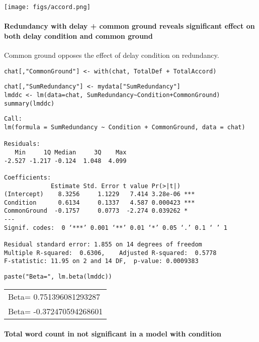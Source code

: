 \documentclass[10pt]{article}
\begin{document}
\texttt{[image: figs/accord.png]}


\paragraph*{Redundancy with delay + common ground reveals significant effect on both delay condition and common ground}
\label{sec-2-4-3-2}

Common ground opposes the effect of delay condition on redundancy.

\begin{verbatim}
chat[,"CommonGround"] <- with(chat, TotalDef + TotalAccord)
\end{verbatim}


\begin{verbatim}
chat[,"SumRedundancy"] <- mydata["SumRedundancy"]
lmddc <- lm(data=chat, SumRedundancy~Condition+CommonGround)
summary(lmddc)
\end{verbatim}

\begin{verbatim}
Call:
lm(formula = SumRedundancy ~ Condition + CommonGround, data = chat)

Residuals:
   Min     1Q Median     3Q    Max 
-2.527 -1.217 -0.124  1.048  4.099 

Coefficients:
             Estimate Std. Error t value Pr(>|t|)    
(Intercept)    8.3256     1.1229   7.414 3.28e-06 ***
Condition      0.6134     0.1337   4.587 0.000423 ***
CommonGround  -0.1757     0.0773  -2.274 0.039262 *  
---
Signif. codes:  0 ‘***’ 0.001 ‘**’ 0.01 ‘*’ 0.05 ‘.’ 0.1 ‘ ’ 1

Residual standard error: 1.855 on 14 degrees of freedom
Multiple R-squared:  0.6306,	Adjusted R-squared:  0.5778 
F-statistic: 11.95 on 2 and 14 DF,  p-value: 0.0009383
\end{verbatim}


\begin{verbatim}
paste("Beta=", lm.beta(lmddc))
\end{verbatim}

\begin{center}
\begin{tabular}{l}
Beta= 0.751396081293287\\
Beta= -0.372470594268601\\
\end{tabular}
\end{center}


\paragraph*{Total word count in not significant in a model with condition}
\label{sec-2-4-3-3}
\end{document}
